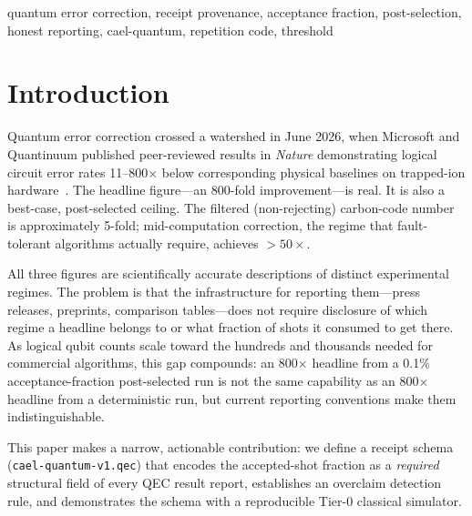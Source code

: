 \documentclass[conference]{IEEEtran}
\begin{document}
\begin{IEEEkeywords}
quantum error correction, receipt provenance, acceptance fraction,
post-selection, honest reporting, cael-quantum, repetition code, threshold
\end{IEEEkeywords}

\section{Introduction}
\label{sec:intro}

Quantum error correction crossed a watershed in June 2026, when
Microsoft and Quantinuum published peer-reviewed results in \textit{Nature}
demonstrating logical circuit error rates 11--800$\times$ below
corresponding physical baselines on trapped-ion
hardware~\cite{msft-quantinuum-nature2026}. The headline figure---an
800-fold improvement---is real. It is also a best-case, post-selected
ceiling. The filtered (non-rejecting) carbon-code number is approximately
5-fold; mid-computation correction, the regime that fault-tolerant
algorithms actually require, achieves $> 50\times$.

All three figures are scientifically accurate descriptions of distinct
experimental regimes. The problem is that the infrastructure for
reporting them---press releases, preprints, comparison tables---does not
require disclosure of which regime a headline belongs to or what fraction
of shots it consumed to get there. As logical qubit counts scale toward
the hundreds and thousands needed for commercial algorithms, this gap
compounds: an 800$\times$ headline from a 0.1\% acceptance-fraction
post-selected run is not the same capability as an 800$\times$ headline
from a deterministic run, but current reporting conventions make them
indistinguishable.

This paper makes a narrow, actionable contribution: we define a receipt
schema (\texttt{cael-quantum-v1.qec}) that encodes the accepted-shot
fraction as a \emph{required} structural field of every QEC result report,
establishes an overclaim detection rule, and demonstrates the schema with
a reproducible Tier-0 classical simulator.
\end{document}
